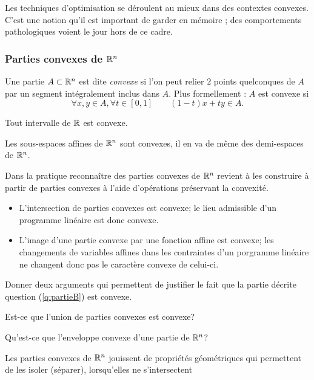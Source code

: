 \documentclass[11pt, a4paper]{article}
\begin{document}
Les techniques d'optimisation se déroulent au mieux dans des contextes
convexes. C'est une notion qu'il est important de garder en mémoire ;
des comportements pathologiques voient le jour hors de ce cadre.

\subsubsection{Parties convexes de $\mathbb{R}^n$}
\label{sec:partiesconvexes}

\begin{defn}
  Une partie $A \subset \mathbb{R}^n$ est dite \emph{convexe} si l'on peut
  relier $2$ points quelconques de $A$ par un segment intégralement
  inclus dans $A$. Plus formellement : $A$ est convexe si
  \[
    \forall x, y \in A, \forall t \in [0, 1] \qquad (1-t)x + ty \in A.
  \]
\end{defn}
\begin{exmp}
  Tout intervalle de $\mathbb{R}$ est convexe.
\end{exmp}
\begin{exmp}
  Les sous-espaces affines de $\mathbb{R}^n$ sont convexes, il en va de même des
  demi-espaces de $\mathbb{R}^n$.
\end{exmp}
Dans la pratique reconnaître des parties convexes de $\mathbb{R}^n$ revient à
les construire à partir de parties convexes à l'aide d'opérations
préservant la convexité.
\begin{itemize}
\item L'intersection de parties convexes est convexe; le lieu
  admissible d'un programme linéaire est donc convexe.
\item L'image d'une partie convexe par une fonction affine est
  convexe; les changements de variables affines dans les contraintes
  d'un porgramme linéaire ne changent donc pas le caractère convexe de
  celui-ci.
\end{itemize}
\begin{question}
  Donner deux arguments qui permettent de justifier le fait que la
  partie décrite question (\ref{q:partieB}) est convexe.
\end{question}
\begin{question}
  Est-ce que l'union de parties convexes est convexe?
\end{question}
\begin{question}
  Qu'est-ce que l'enveloppe convexe d'une partie de $\mathbb{R}^n$?
\end{question}
Les parties convexes de $\mathbb{R}^n$ jouissent de propriétés géométriques
qui permettent de les isoler (séparer), lorsqu'elles ne s'intersectent
\end{document}
